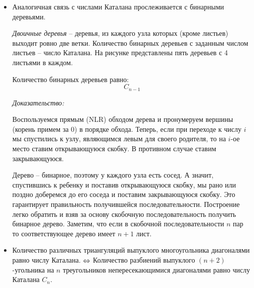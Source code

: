\begin{itemize}
	\item Аналогичная связь с числами Каталана прослеживается с бинарными деревьями. 
	
	\textit{Двоичные деревья} – деревья, из каждого узла которых (кроме листьев) выходит ровно две ветки. Количество бинарных деревьев с заданным числом листьев – число Каталана. На рисунке представлены пять деревьев с 4 листьями в каждом.
	\begin{figure}[H]
	\end{figure}

	Количество бинарных деревьев равно:
	\[ C_{n-1} \]

	\noindent\textit{Доказательство:}
	
	Воспользуемся прямым (NLR) обходом дерева и пронумеруем вершины (корень примем за 0) в порядке обхода. Теперь, если при переходе к числу $i$ мы спустились к узлу, являющимся левым для своего родителя, то на $i$-ое место ставим открывающуюся скобку. В противном случае ставим закрывающуюся.
	\begin{figure}[H]
	\end{figure}
	Дерево – бинарное, поэтому у каждого узла есть сосед. А значит, спустившись к ребенку и поставив открывающуюся скобку, мы рано или поздно доберемся до его соседа и поставим закрывающуюся скобку. Это гарантирует правильность получившейся последовательности. Построение легко обратить и взяв за основу скобочную последовательность получить бинарное дерево.
	Заметим, что если в скобочной последовательности $n$ пар то соответствующее дерево имеет $n+1$ лист.

	\item Количество различных триангуляций выпуклого многоугольника диагоналями равно числу Каталана. $\operatorname{\Leftrightarrow}$ Количество разбиений выпуклого $(n + 2)$-угольника на $n$ треугольников непересекающимися диагоналями равно числу Каталана $C_n$.
	

\end{itemize}
